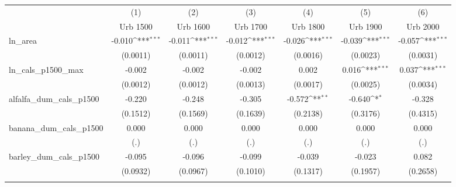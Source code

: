 {
\def\sym#1{\ifmmode^{#1}\else\(^{#1}\)\fi}
\begin{tabular}{l*{6}{c}}
\toprule
                    &\multicolumn{1}{c}{(1)}&\multicolumn{1}{c}{(2)}&\multicolumn{1}{c}{(3)}&\multicolumn{1}{c}{(4)}&\multicolumn{1}{c}{(5)}&\multicolumn{1}{c}{(6)}\\
                    &\multicolumn{1}{c}{Urb 1500}&\multicolumn{1}{c}{Urb 1600}&\multicolumn{1}{c}{Urb 1700}&\multicolumn{1}{c}{Urb 1800}&\multicolumn{1}{c}{Urb 1900}&\multicolumn{1}{c}{Urb 2000}\\
\midrule
ln\_area             &      -0.010\sym{***}&      -0.011\sym{***}&      -0.012\sym{***}&      -0.026\sym{***}&      -0.039\sym{***}&      -0.057\sym{***}\\
                    &    (0.0011)         &    (0.0011)         &    (0.0012)         &    (0.0016)         &    (0.0023)         &    (0.0031)         \\
\addlinespace
ln\_cals\_p1500\_max   &      -0.002         &      -0.002         &      -0.002         &       0.002         &       0.016\sym{***}&       0.037\sym{***}\\
                    &    (0.0012)         &    (0.0012)         &    (0.0013)         &    (0.0017)         &    (0.0025)         &    (0.0034)         \\
\addlinespace
alfalfa\_dum\_cals\_p1500&      -0.220         &      -0.248         &      -0.305         &      -0.572\sym{**} &      -0.640\sym{*}  &      -0.328         \\
                    &    (0.1512)         &    (0.1569)         &    (0.1639)         &    (0.2138)         &    (0.3176)         &    (0.4315)         \\
\addlinespace
banana\_dum\_cals\_p1500&       0.000         &       0.000         &       0.000         &       0.000         &       0.000         &       0.000         \\
                    &         (.)         &         (.)         &         (.)         &         (.)         &         (.)         &         (.)         \\
\addlinespace
barley\_dum\_cals\_p1500&      -0.095         &      -0.096         &      -0.099         &      -0.039         &      -0.023         &       0.082         \\
                    &    (0.0932)         &    (0.0967)         &    (0.1010)         &    (0.1317)         &    (0.1957)         &    (0.2658)         \\
\addlinespace

\end{tabular}}
